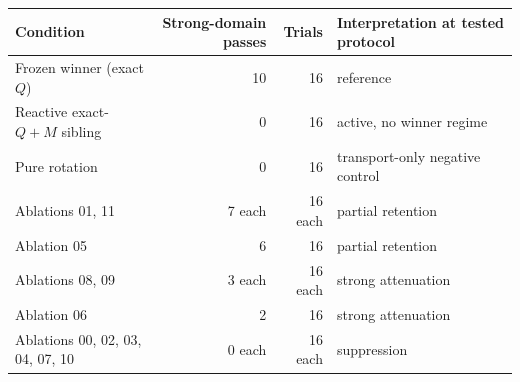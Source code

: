 \begin{tabular}{@{}lrrl@{}}
\toprule
Condition & Strong-domain passes & Trials & Interpretation at tested protocol \\
\midrule
Frozen winner (exact $Q$) & 10 & 16 & reference \\
Reactive exact-$Q{+}M$ sibling & 0 & 16 & active, no winner regime \\
Pure rotation & 0 & 16 & transport-only negative control \\
Ablations 01, 11 & 7 each & 16 each & partial retention \\
Ablation 05 & 6 & 16 & partial retention \\
Ablations 08, 09 & 3 each & 16 each & strong attenuation \\
Ablation 06 & 2 & 16 & strong attenuation \\
Ablations 00, 02, 03, 04, 07, 10 & 0 each & 16 each & suppression \\
\bottomrule
\end{tabular}
